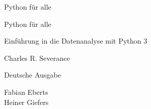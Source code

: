 
\begin{titlepage}
\begin{center}
\vspace*{15mm}

\sffamily
\LARGE
Python für alle

\end{center}
\end{titlepage}


\cleardoublepage
\thispagestyle{plain}

\begin{center}
\vspace*{15mm}

\sffamily
\LARGE
Python für alle

\Large
Einführung in die Datenanalyse mit Python 3

\vspace{15mm}

\Large
Charles R. Severance

\vspace{10mm}

\normalsize
Deutsche Ausgabe

\vspace{2mm}

\large
Fabian Eberts\\
Heiner Giefers



\end{center}

\normalsize
\normalfont
